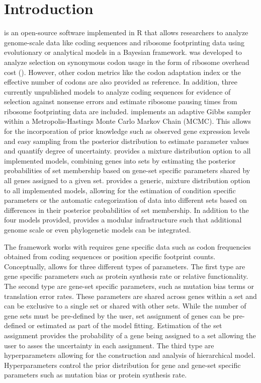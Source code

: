 \section{Introduction}

\package is  an open-source software implemented in R \citep{rcore} that allows researchers to analyze genome-scale data like coding sequences and ribosome footprinting data using evolutionary or analytical models in a Bayesian framework. 
\package was developed to analyze selection on synonymous codon usage in the form of ribosome overhead cost (\citep{gilchrist2015,wallace2013,shah2011}).
However, other codon metrics like the codon adaptation index \citep{Sharp1987} or the effective number of codons \citep{Wright1990} are also provided as reference.
In addition, three currently unpublished models to analyze coding sequences for evidence of selection against nonsense errors and estimate ribosome pausing times from ribosome footprinting data are included.
\package implements an adaptive Gibbs sampler within a Metropolis-Hastings Monte Carlo Markov Chain (MCMC). 
This allows for the incorporation of prior knowledge such as observed gene expression levels and easy sampling from the posterior distribution to estimate parameter values and quantify degree of uncertainty.
\package provides a mixture distribution option to all implemented models, combining genes into sets by estimating the posterior probabilities of set membership based on gene-set specific parameters shared by all genes assigned to a given set. 
\package provides a generic, mixture distribution option to all implemented models, allowing for the estimation of condition specific parameters or the automatic categorization of data into different sets based on differences in their posterior probabilities of set membership.
In addition to the four models provided, \package provides a modular infrastructure such that additional genome scale or even phylogenetic models can be integrated.

The \package framework works with \package requires gene specific data such as codon frequencies obtained from coding sequences or position specific footprint counts.
Conceptually, \package allows for three different types of parameters.
The first type are gene specific parameters such as protein synthesis rate or relative functionality.
The second type are gene-set specific parameters, such as mutation bias terms or translation error rates.
These parameters are shared across genes within a set and can be exclusive to a single set or shared with other sets.
While the number of gene sets must be pre-defined by the user, set assignment of genes can be pre-defined or estimated as part of the model fitting.
Estimation of the set assignment provides the probability of a gene being assigned to a set allowing the user to asses the uncertainty in each assignment.
The third type are hyperparameters allowing for the construction and analysis of hierarchical model. Hyperparameters control the prior distribution for gene and gene-set specific parameters such as mutation bias or protein synthesis rate.


